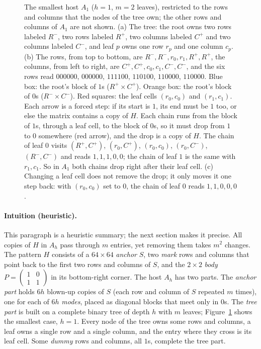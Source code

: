 \documentclass{article}
\theoremstyle{plain}
\theoremstyle{definition}
\begin{document}
\begin{figure}[t]
\caption{The smallest host $A_1$ ($h = 1$, $m = 2$ leaves), restricted to the rows and columns
that the nodes of the tree own; the other rows and columns of $A_1$ are not shown. (a) The tree:
the root owns two rows labeled $R^-$, two rows labeled $R^+$, two columns labeled $C^+$ and two
columns labeled $C^-$, and leaf $p$ owns one row $r_p$ and one column $c_p$. (b) The rows, from top
to bottom, are $R^-, R^-, r_0, r_1, R^+, R^+$, the columns, from left to right, are
$C^+, C^+, c_0, c_1, C^-, C^-$, and the six rows read $000000$, $000000$, $111100$, $110100$,
$110000$, $110000$. Blue box: the root's block of $1$s ($R^+ \times C^+$). Orange box: the root's
block of $0$s ($R^- \times C^-$). Red squares: the leaf cells $(r_0, c_0)$ and $(r_1, c_1)$. Each
arrow is a forced step: if its start is $1$, its end must be $1$ too, or else the matrix contains
a copy of $H$. Each chain runs from the block of $1$s, through a leaf cell, to the block of $0$s,
so it must drop from $1$ to $0$ somewhere (red arrow), and the drop is a copy of $H$. The chain of
leaf $0$ visits $(R^+, C^+)$, $(r_0, C^+)$, $(r_0, c_0)$, $(r_0, C^-)$, $(R^-, C^-)$ and reads
$1, 1, 1, 0, 0$; the chain of leaf $1$ is the same with $r_1, c_1$. So in $A_1$ both chains drop
right after their leaf cell. (c) Changing a leaf cell does not remove the drop; it only moves it
one step back: with $(r_0, c_0)$ set to $0$, the chain of leaf $0$ reads $1, 1, 0, 0, 0$.}
\label{fig:tree-matrix}
\end{figure}


  \paragraph{Intuition (heuristic).}
  This paragraph is a heuristic summary; the next section makes it precise.
  All copies of $H$ in $A_h$ pass through $m$ entries, yet removing them takes
  $m^2$ changes. The pattern $H$ consists of a $64 \times 64$ \emph{anchor} $S$,
  two \emph{mark} rows and columns that point back to the first two rows and
  columns of $S$, and the $2 \times 2$ \emph{body}
  $P = \begin{pmatrix} 1 & 0 \\ 1 & 1 \end{pmatrix}$ in its bottom-right corner.
  The host $A_h$ has two parts. The \emph{anchor part} holds $6h$ blown-up copies
  of $S$ (each row and column of $S$ repeated $m$ times), one for each of $6h$
  \emph{modes}, placed as diagonal blocks that meet only in $0$s. The
  \emph{tree part} is built on a complete binary tree of depth $h$ with $m$
  leaves; Figure~\ref{fig:tree-matrix} shows the smallest case, $h = 1$. Every
  node of the tree owns some rows and columns, a leaf owns a single row and a
  single column, and the entry where they cross is its leaf cell. Some
  \emph{dummy} rows and columns, all $1$s, complete the tree part.
\end{document}
